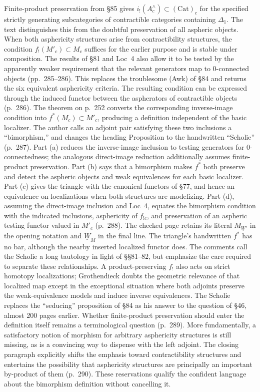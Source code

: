 \documentclass[10pt,oneside]{book}
\begin{document}
Finite-product preservation from \S85 gives $i_!(A^\wedge_c)\subset(\mathrm{Cat})_c$ for the specified strictly generating subcategories of contractible categories containing $\Delta_1$. The text distinguishes this from the doubtful preservation of all aspheric objects. When both asphericity structures arise from contractibility structures, the condition $f_!(M'_c)\subset M_c$ suffices for the earlier purpose and is stable under composition. The results of \S81 and Loc~4 also allow it to be tested by the apparently weaker requirement that the relevant generators map to 0-connected objects (pp.\ 285--286). This replaces the troublesome (Awk) of \S84 and returns the six equivalent asphericity criteria. The resulting condition can be expressed through the induced functor between the aspherators of contractible objects (p.\ 286). The theorem on p.\ 252 converts the corresponding inverse-image condition into $f^*(M_c)\subset M'_c$, producing a definition independent of the basic localizer. The author calls an adjoint pair satisfying these two inclusions a “bimorphism,” and changes the heading Proposition to the handwritten “Scholie” (p.\ 287). Part (a) reduces the inverse-image inclusion to testing generators for 0-connectedness; the analogous direct-image reduction additionally assumes finite-product preservation. Part (b) says that a bimorphism makes $f^*$ both preserve and detect the aspheric objects and weak equivalences for each basic localizer. Part (c) gives the triangle with the canonical functors of \S77, and hence an equivalence on localizations when both structures are modelizing. Part (d), assuming the direct-image inclusion and Loc~4, equates the bimorphism condition with the indicated inclusions, asphericity of $f_{!c}$, and preservation of an aspheric testing functor valued in $M'_c$ (p.\ 288). The checked page retains its literal $M_{\underline W'}$ in the opening notation and $\underline W_M$ in the final line. The triangle's handwritten $f^*$ has no bar, although the nearby inserted localized functor does. The comments call the Scholie a long tautology in light of \S\S81--82, but emphasize the care required to separate these relationships. A product-preserving $f_!$ also acts on strict homotopy localizations; Grothendieck doubts the geometric relevance of that localized map except in the exceptional situation where both adjoints preserve the weak-equivalence models and induce inverse equivalences. The Scholie replaces the “seducing” proposition of \S84 as his answer to the question of \S46, almost 200 pages earlier. Whether finite-product preservation should enter the definition itself remains a terminological question (p.\ 289). More fundamentally, a satisfactory notion of morphism for arbitrary asphericity structures is still missing, as is a convincing way to dispense with the left adjoint. The closing paragraph explicitly shifts the emphasis toward contractibility structures and entertains the possibility that asphericity structures are principally an important by-product of them (p.\ 290). These reservations qualify the confident language about the bimorphism definition without cancelling it.
\end{document}
